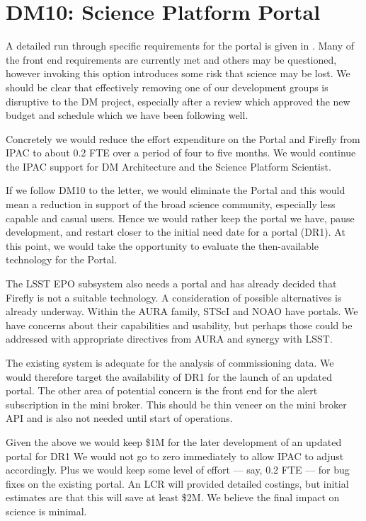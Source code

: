 \section{DM10: Science Platform Portal}\label{sect:dm10}

A detailed run through specific requirements for the portal is given in .
Many of the front end requirements are currently met and others may be questioned, however invoking this option introduces some risk that science may be lost.
We should be clear that effectively removing one of our development groups is disruptive to the DM project,
 especially after a
review which approved the new budget and schedule which we have been following well.

Concretely we would reduce the effort expenditure on the Portal and Firefly from IPAC to about 0.2 FTE over a period of four to five months.
We would continue the IPAC support for DM Architecture and the Science Platform Scientist.

If we follow DM10 to the letter, we would eliminate the Portal and this would mean a reduction in support of the broad science community, especially less capable and casual users.
Hence we would rather keep the portal we have, pause development, and restart closer to the initial need date for a portal (DR1).
At this point, we would take the opportunity to evaluate the then-available technology for the Portal.

The LSST EPO subsystem also needs a portal and has already decided that
Firefly is not a suitable technology. A consideration of possible alternatives
is already underway.
Within the AURA family, STScI and NOAO have portals.
We have concerns about their capabilities and usability, but perhaps those could be addressed with appropriate directives from AURA and synergy with LSST.

The existing system is adequate for the analysis of commissioning data.
We would therefore target the availability of DR1 for the launch of an updated
portal.
The other area of potential concern is the front end for the alert subscription in the mini broker.
This should be thin veneer on the mini broker API and is also not needed until start of operations.

Given the above  we would keep \$1M for the later development of an updated portal for DR1
We would not go to zero immediately to allow IPAC to adjust accordingly.
Plus we would keep some level of effort --- say, 0.2 FTE --- for bug fixes on the existing portal.
An LCR will provided detailed costings, but initial estimates are that this will save at least \$2M.
We believe the final impact on science is minimal.
